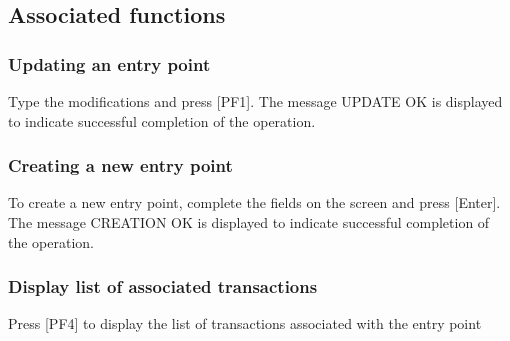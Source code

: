 \documentclass[letterpaper,10pt,english]{sphinxmanual}
\begin{document}
\subsection{Associated functions}
\label{\detokenize{connectivity_guide:id11}}

\subsubsection{Updating an entry point}
\label{\detokenize{connectivity_guide:updating-an-entry-point}}
Type the modifications and press {[}PF1{]}. The message UPDATE OK is displayed to indicate successful completion of the operation.


\subsubsection{Creating a new entry point}
\label{\detokenize{connectivity_guide:creating-a-new-entry-point}}
To create a new entry point, complete the fields on the screen and press {[}Enter{]}. The message CREATION OK is displayed to indicate successful completion of the operation.


\subsubsection{Display list of associated transactions}
\label{\detokenize{connectivity_guide:display-list-of-associated-transactions}}
Press {[}PF4{]} to display the list of transactions associated with the entry point
\end{document}
